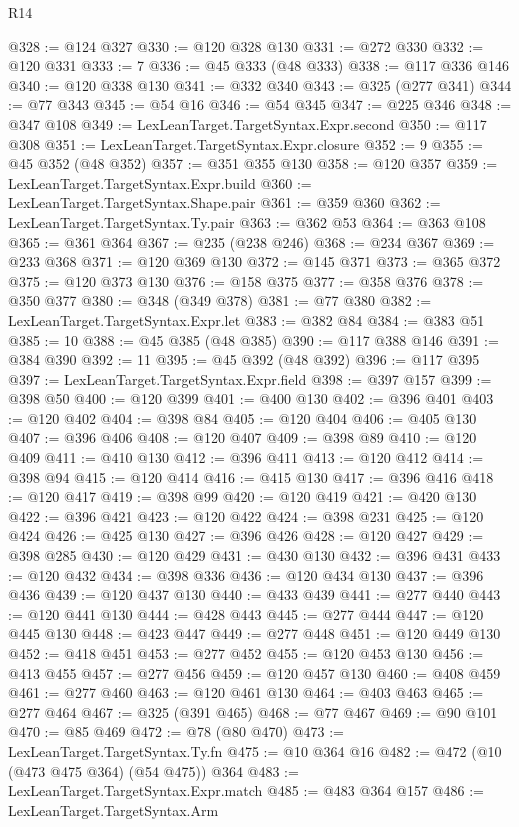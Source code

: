 \begin{lexlean}{R14}
\begin{coremodule}
{{{{{{{{{{{{{{{{{{{{{{{{{{{{{{{{{{{{{{{{{{{{{{{{{{{{{{{{{{{{{{{{{{{{{{{{{{{{{{{{{{{{{{{{{{{{{{{{{{{{{{{{{{@328 := @124 @327
@330 := @120 @328 @130
@331 := @272 @330
@332 := @120 @331
@333 := 7
@336 := @45 @333 (@48 @333)
@338 := @117 @336 @146
@340 := @120 @338 @130
@341 := @332 @340
@343 := @325 (@277 @341)
@344 := @77 @343
@345 := @54 @16
@346 := @54 @345
@347 := @225 @346
@348 := @347 @108
@349 := LexLeanTarget.TargetSyntax.Expr.second
@350 := @117 @308
@351 := LexLeanTarget.TargetSyntax.Expr.closure
@352 := 9
@355 := @45 @352 (@48 @352)
@357 := @351 @355 @130
@358 := @120 @357
@359 := LexLeanTarget.TargetSyntax.Expr.build
@360 := LexLeanTarget.TargetSyntax.Shape.pair
@361 := @359 @360
@362 := LexLeanTarget.TargetSyntax.Ty.pair
@363 := @362 @53
@364 := @363 @108
@365 := @361 @364
@367 := @235 (@238 @246)
@368 := @234 @367
@369 := @233 @368
@371 := @120 @369 @130
@372 := @145 @371
@373 := @365 @372
@375 := @120 @373 @130
@376 := @158 @375
@377 := @358 @376
@378 := @350 @377
@380 := @348 (@349 @378)
@381 := @77 @380
@382 := LexLeanTarget.TargetSyntax.Expr.let
@383 := @382 @84
@384 := @383 @51
@385 := 10
@388 := @45 @385 (@48 @385)
@390 := @117 @388 @146
@391 := @384 @390
@392 := 11
@395 := @45 @392 (@48 @392)
@396 := @117 @395
@397 := LexLeanTarget.TargetSyntax.Expr.field
@398 := @397 @157
@399 := @398 @50
@400 := @120 @399
@401 := @400 @130
@402 := @396 @401
@403 := @120 @402
@404 := @398 @84
@405 := @120 @404
@406 := @405 @130
@407 := @396 @406
@408 := @120 @407
@409 := @398 @89
@410 := @120 @409
@411 := @410 @130
@412 := @396 @411
@413 := @120 @412
@414 := @398 @94
@415 := @120 @414
@416 := @415 @130
@417 := @396 @416
@418 := @120 @417
@419 := @398 @99
@420 := @120 @419
@421 := @420 @130
@422 := @396 @421
@423 := @120 @422
@424 := @398 @231
@425 := @120 @424
@426 := @425 @130
@427 := @396 @426
@428 := @120 @427
@429 := @398 @285
@430 := @120 @429
@431 := @430 @130
@432 := @396 @431
@433 := @120 @432
@434 := @398 @336
@436 := @120 @434 @130
@437 := @396 @436
@439 := @120 @437 @130
@440 := @433 @439
@441 := @277 @440
@443 := @120 @441 @130
@444 := @428 @443
@445 := @277 @444
@447 := @120 @445 @130
@448 := @423 @447
@449 := @277 @448
@451 := @120 @449 @130
@452 := @418 @451
@453 := @277 @452
@455 := @120 @453 @130
@456 := @413 @455
@457 := @277 @456
@459 := @120 @457 @130
@460 := @408 @459
@461 := @277 @460
@463 := @120 @461 @130
@464 := @403 @463
@465 := @277 @464
@467 := @325 (@391 @465)
@468 := @77 @467
@469 := @90 @101
@470 := @85 @469
@472 := @78 (@80 @470)
@473 := LexLeanTarget.TargetSyntax.Ty.fn
@475 := @10 @364 @16
@482 := @472 (@10 (@473 @475 @364) (@54 @475)) @364
@483 := LexLeanTarget.TargetSyntax.Expr.match
@485 := @483 @364 @157
@486 := LexLeanTarget.TargetSyntax.Arm
}}}}}}}}}}}}}}}}}}}}}}}}}}}}}}}}}}}}}}}}}}}}}}}}}}}}}}}}}}}}}}}}}}}}}}}}}}}}}}}}}}}}}}}}}}}}}}}}}}}}}}}}}}
\end{coremodule}
\end{lexlean}
